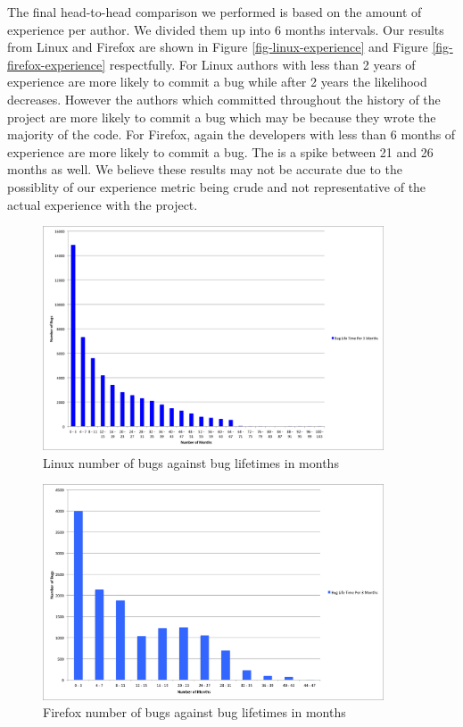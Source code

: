 \documentclass[preprint, 11pt]{sigplanconf}
\begin{document}
The final head-to-head comparison we performed is based on the amount
of experience per author. We divided them up into 6 months intervals. 
Our results from Linux and Firefox are shown in Figure
\ref{fig-linux-experience} and Figure \ref{fig-firefox-experience}
respectfully. For Linux authors with less than 2 years of experience
are more likely to commit a bug while after 2 years the likelihood
decreases. However the authors which committed throughout the history
of the project are more likely to commit a bug which may be because
they wrote the majority of the code. For Firefox, again the
developers with less than 6 months of experience are more likely to
commit a bug. The is a spike between 21 and 26 months as well. We
believe these results may not be accurate due to the possiblity of
our experience metric being crude and not representative of the 
actual experience with the project.

\begin{figure}
\begin{center}
\includegraphics[width=0.9\textwidth]{linux_bug_life.png}
\end{center}
\caption{Linux number of bugs against bug lifetimes in months}
\label{fig-linux-buglife}
\end{figure}

\begin{figure}
\begin{center}
\includegraphics[width=0.9\textwidth]{firefox_bug_life.png}
\end{center}
\caption{Firefox number of bugs against bug lifetimes in months}
\label{fig-firefox-buglife}
\end{figure}
\end{document}
